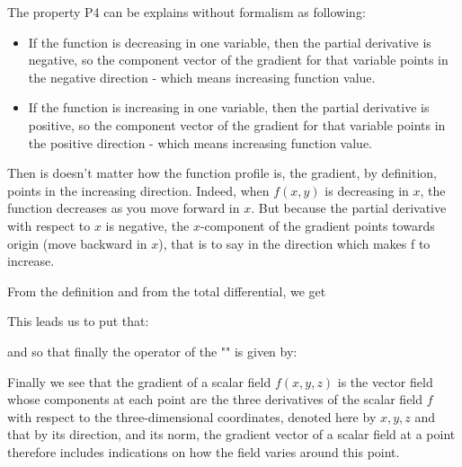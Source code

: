	The property P4 can be explains without formalism as following:
	\begin{itemize}
		\item If the function is decreasing in one variable, then the partial derivative is negative, so the component vector of the gradient for that variable points in the negative direction - which means increasing function value.

		\item If the function is increasing in one variable, then the partial derivative is positive, so the component vector of the gradient for that variable points in the positive direction - which means increasing function value.
	\end{itemize}
	Then is doesn't matter how the function profile is, the gradient, by definition, points in the increasing direction. Indeed, when 	
$f(x,y)$ is decreasing in $x$, the function decreases as you move forward in $x$. But because the partial derivative with respect to $x$ is negative, the $x$-component of the gradient points towards origin (move backward in $x$), that is to say in the direction which makes f to increase.
	
	From the definition and from the total differential, we get
	
	This leads us to put that:
	
	and so that finally the operator of the "" is given by:
	
	Finally we see that the gradient of a scalar field $f(x,y,z)$ is the vector field whose components at each point are the three derivatives of the scalar field $f$ with respect to the three-dimensional coordinates, denoted here by $x, y, z$ and that by its direction, and its norm, the gradient vector of a scalar field at a point therefore includes indications on how the field varies around this point.
	
